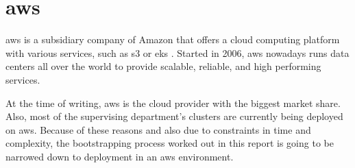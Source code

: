 
\section{\ac{aws}}
\ac{aws} is a subsidiary company of Amazon that offers a cloud computing platform with various services, such as \ac{s3} \cite{aws.s3} or \ac{eks} \cite{aws.eks}.
Started in 2006, \ac{aws} nowadays runs data centers all over the world to provide scalable, reliable, and high performing services. \cite{aws.linkedin, whatisaws}

At the time of writing, \ac{aws} is the cloud provider with the biggest market share. \cite{aws.marketshare}
Also, most of the supervising department's clusters are currently being deployed on \ac{aws}.
Because of these reasons and also due to constraints in time and complexity, the bootstrapping process worked out in this report is going to be narrowed down to deployment in an \ac{aws} environment.

